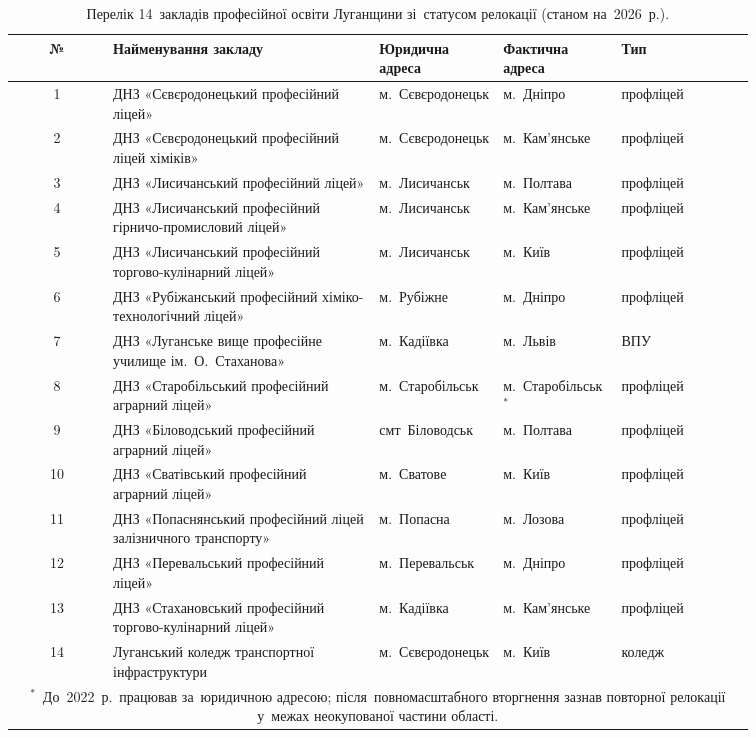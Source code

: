 \begin{table}[htbp]
\centering
\caption{Перелік 14~закладів професійної освіти Луганщини зі~статусом релокації (станом на~2026~р.).}
\label{tab:institutions-list}
\footnotesize
\setlength\tabcolsep{3pt}
\renewcommand{\arraystretch}{1.15}
\begin{tabular}{|c|p{0.36\linewidth}|p{0.16\linewidth}|p{0.16\linewidth}|p{0.18\linewidth}|}
\hline
\textbf{№} & \textbf{Найменування закладу} & \textbf{Юридична адреса} & \textbf{Фактична адреса} & \textbf{Тип} \\
\hline
1 & ДНЗ «Сєвєродонецький професійний ліцей» & м.~Сєвєродонецьк & м.~Дніпро & профліцей \\
\hline
2 & ДНЗ «Сєвєродонецький професійний ліцей хіміків» & м.~Сєвєродонецьк & м.~Кам'янське & профліцей \\
\hline
3 & ДНЗ «Лисичанський професійний ліцей» & м.~Лисичанськ & м.~Полтава & профліцей \\
\hline
4 & ДНЗ «Лисичанський професійний гірничо-промисловий ліцей» & м.~Лисичанськ & м.~Кам'янське & профліцей \\
\hline
5 & ДНЗ «Лисичанський професійний торгово-кулінарний ліцей» & м.~Лисичанськ & м.~Київ & профліцей \\
\hline
6 & ДНЗ «Рубіжанський професійний хіміко-технологічний ліцей» & м.~Рубіжне & м.~Дніпро & профліцей \\
\hline
7 & ДНЗ «Луганське вище професійне училище ім.~О.~Стаханова» & м.~Кадіївка & м.~Львів & ВПУ \\
\hline
8 & ДНЗ «Старобільський професійний аграрний ліцей» & м.~Старобільськ & м.~Старобільськ$^{*}$ & профліцей \\
\hline
9 & ДНЗ «Біловодський професійний аграрний ліцей» & смт~Біловодськ & м.~Полтава & профліцей \\
\hline
10 & ДНЗ «Сватівський професійний аграрний ліцей» & м.~Сватове & м.~Київ & профліцей \\
\hline
11 & ДНЗ «Попаснянський професійний ліцей залізничного транспорту» & м.~Попасна & м.~Лозова & профліцей \\
\hline
12 & ДНЗ «Перевальський професійний ліцей» & м.~Перевальськ & м.~Дніпро & профліцей \\
\hline
13 & ДНЗ «Стахановський професійний торгово-кулінарний ліцей» & м.~Кадіївка & м.~Кам'янське & профліцей \\
\hline
14 & Луганський коледж транспортної інфраструктури & м.~Сєвєродонецьк & м.~Київ & коледж \\
\hline
\multicolumn{5}{|p{0.95\linewidth}|}{\footnotesize $^{*}$~До~2022~р.\ працював за~юридичною адресою; після~повномасштабного вторгнення зазнав повторної релокації у~межах неокупованої частини області.} \\
\hline
\end{tabular}
\end{table}


